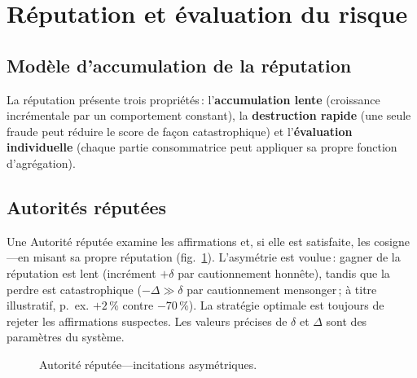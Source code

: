 \documentclass[11pt,a4paper,twocolumn]{article}
\begin{document}
\section{Réputation et évaluation du risque}

\subsection{Modèle d'accumulation de la réputation}

La réputation présente trois propriétés\,: l'\textbf{accumulation lente} (croissance incrémentale par un comportement constant), la \textbf{destruction rapide} (une seule fraude peut réduire le score de façon catastrophique) et l'\textbf{évaluation individuelle} (chaque partie consommatrice peut appliquer sa propre fonction d'agrégation).

\subsection{Autorités réputées}

Une Autorité réputée examine les affirmations et, si elle est satisfaite, les cosigne---en misant sa propre réputation (fig.~\ref{fig:authority}). L'asymétrie est voulue\,: gagner de la réputation est lent (incrément $+\delta$ par cautionnement honnête), tandis que la perdre est catastrophique ($-\Delta \gg \delta$ par cautionnement mensonger\,; à titre illustratif, p.~ex. $+2\,\%$ contre $-70\,\%$). La stratégie optimale est toujours de rejeter les affirmations suspectes. Les valeurs précises de $\delta$ et $\Delta$ sont des paramètres du système.

\begin{figure}[ht]
\centering
{}
\caption{Autorité réputée---incitations asymétriques.}
\label{fig:authority}
\end{figure}
\end{document}
